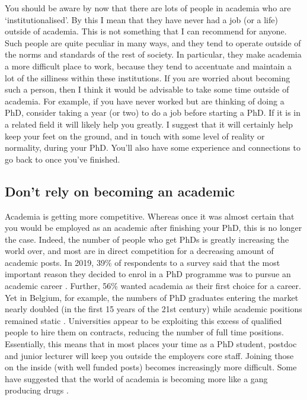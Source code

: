 \documentclass[
]{krantz}
\begin{document}
You should be aware by now that there are lots of people in academia who are `institutionalised'. By this I mean that they have never had a job (or a life) outside of academia. This is not something that I can recommend for anyone. Such people are quite peculiar in many ways, and they tend to operate outside of the norms and standards of the rest of society. In particular, they make academia a more difficult place to work, because they tend to accentuate and maintain a lot of the silliness within these institutions. If you are worried about becoming such a person, then I think it would be advisable to take some time outside of academia. For example, if you have never worked but are thinking of doing a PhD, consider taking a year (or two) to do a job before starting a PhD. If it is in a related field it will likely help you greatly. I suggest that it will certainly help keep your feet on the ground, and in touch with some level of reality or normality, during your PhD. You'll also have some experience and connections to go back to once you've finished.

\hypertarget{dont-rely-on-becoming-an-academic}{%
\subsection{Don't rely on becoming an academic}\label{dont-rely-on-becoming-an-academic}}

Academia is getting more competitive. Whereas once it was almost certain that you would be employed as an academic after finishing your PhD, this is no longer the case. Indeed, the number of people who get PhDs is greatly increasing the world over, and most are in direct competition for a decreasing amount of academic posts. In 2019, 39\% of respondents to a survey said that the most important reason they decided to enrol in a PhD programme was to pursue an academic career \citep{woolston2019phds}. Further, 56\% wanted academia as their first choice for a career. Yet in Belgium, for example, the numbers of PhD graduates entering the market nearly doubled (in the first 15 years of the 21st century) while academic positions remained static \citep{levecque2017work}. Universities appear to be exploiting this excess of qualified people to hire them on contracts, reducing the number of full time positions. Essentially, this means that in most places your time as a PhD student, postdoc and junior lecturer will keep you outside the employers core staff. Joining those on the inside (with well funded posts) becomes increasingly more difficult. Some have suggested that the world of academia is becoming more like a gang producing drugs \citep{afonso2014academia}.
\end{document}
